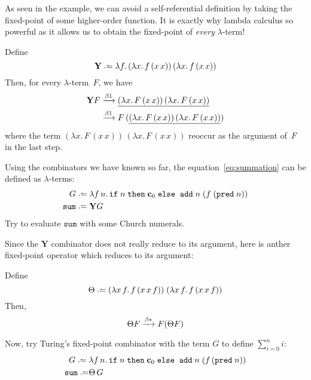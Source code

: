 As seen in the example, we can avoid a self-referential definition by taking the
fixed-point of some higher-order function. It is exactly why lambda calculus so
powerful as it allows us to obtain the fixed-point of \emph{every}
$\lambda$-term!
\begin{proposition}
  Define
  \[
    \mathbf{Y} \defeq
    \lambda f.\, (\lambda x.\, f\,(x\,x))\,(\lambda x.\,f\,(x\,x))
  \]
  Then, for every $\lambda$-term~$F$, we have
  \begin{align*}
    \mathbf{Y}F
    & \xrightarrow{\beta1} \underline{(\lambda x.\,F\,(x\,x))\,(\lambda x.\, F\,(x\,x))} \\
    & \xrightarrow{\beta1} F\,(\underline{(\lambda x.\,F\,(x\,x))\,(\lambda x.\,
      F\,(x\,x))})
  \end{align*}
  where the term $(\lambda x.\,F\,(x\,x))\,(\lambda x.\, F\,(x\,x))$
  reoccur as the argument of~$F$ in the last step.
\end{proposition}
\begin{example}
  Using the combinators we have known so far, the equation~\eqref{eq:summation}
  can be defined as $\lambda$-terms:
  \begin{align*}
    G \defeq{} &
    \lambda f\,n.\, \mathtt{if}\;n\;\mathtt{then}\;\bc_0\;\mathtt{else}\;\;
    \add\;n\;(f\;(\mathtt{pred}\;n)) \\
    \mathtt{sum} \defeq{} & \mathbf{Y}G
  \end{align*}
  Try to evaluate $\mathtt{sum}$ with some Church numerals.
\end{example}
Since the $\mathbf{Y}$ combinator does not really reduce to its argument, here
is anther fixed-point operator which reduces to its argument:
\begin{proposition}
  Define 
  \[
    \Theta \defeq 
    (\lambda x\,f.\,f\,(x\,x\,f))\;
    (\lambda x\,f.\,f\,(x\,x\,f))
  \]
  Then, 
  \[
    \Theta F \xrightarrow{\beta*} F (\Theta F)
  \]
\end{proposition}
\begin{example}
  Now, try Turing's fixed-point combinator with the term $G$ to define
  $\sum_{i=0}^n i$:
  \begin{align*}
    G \defeq{} &
    \lambda f\,n.\,
    \mathtt{if}\;n\;\mathtt{then}\;\bc_0\;\mathtt{else}\;\;
    \add\;n\;(f\,(\mathtt{pred}\;n)) \\
    \mathtt{sum} \defeq & \Theta\,G \\
  \end{align*}
\end{example}

